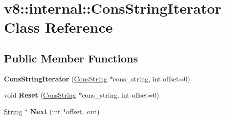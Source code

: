 \hypertarget{classv8_1_1internal_1_1_cons_string_iterator}{}\section{v8\+:\+:internal\+:\+:Cons\+String\+Iterator Class Reference}
\label{classv8_1_1internal_1_1_cons_string_iterator}
\subsection*{Public Member Functions}
\begin{DoxyCompactItemize}
\item 
{\bfseries Cons\+String\+Iterator} (\hyperlink{classv8_1_1internal_1_1_cons_string}{Cons\+String} $\ast$cons\+\_\+string, int offset=0)\hypertarget{classv8_1_1internal_1_1_cons_string_iterator_a0876699d4c98ab069ccb098913c2b48b}{}\label{classv8_1_1internal_1_1_cons_string_iterator_a0876699d4c98ab069ccb098913c2b48b}

\item 
void {\bfseries Reset} (\hyperlink{classv8_1_1internal_1_1_cons_string}{Cons\+String} $\ast$cons\+\_\+string, int offset=0)\hypertarget{classv8_1_1internal_1_1_cons_string_iterator_a33a518a12351201041a1e54225e970ee}{}\label{classv8_1_1internal_1_1_cons_string_iterator_a33a518a12351201041a1e54225e970ee}

\item 
\hyperlink{classv8_1_1internal_1_1_string}{String} $\ast$ {\bfseries Next} (int $\ast$offset\+\_\+out)\hypertarget{classv8_1_1internal_1_1_cons_string_iterator_ac50e2bab2eb1812e5d7428bc1653cd5c}{}\label{classv8_1_1internal_1_1_cons_string_iterator_ac50e2bab2eb1812e5d7428bc1653cd5c}

\end{DoxyCompactItemize}
